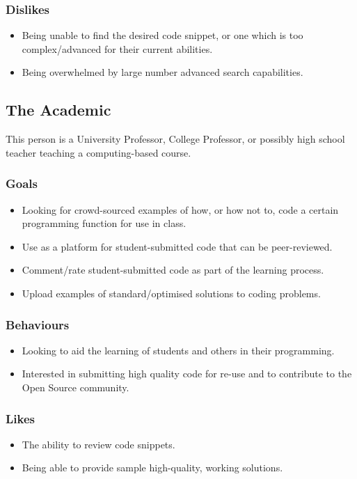 \documentclass[11pt,a4paper]{article}
\begin{document}
\subsubsection{Dislikes}

\begin{itemize}
\item Being unable to find the desired code snippet, or one which is
too complex/advanced for their current abilities.
\item Being overwhelmed by large number advanced search capabilities.
\end{itemize}

\subsection{The Academic}

This person is a University Professor, College Professor, or possibly high
school teacher teaching a computing-based course.

\subsubsection{Goals}

\begin{itemize}
\item Looking for crowd-sourced examples of how, or how not to, code a certain
programming function for use in class.
\item Use as a platform for student-submitted code that can be peer-reviewed.
\item Comment/rate student-submitted code as part of the learning process.
\item Upload examples of standard/optimised solutions to coding problems.
\end{itemize}

\subsubsection{Behaviours}
\begin{itemize}
\item Looking to aid the learning of students and others in their programming.
\item Interested in submitting high quality code for re-use and to contribute
to the Open Source community.
\end{itemize}

\subsubsection{Likes}
\begin{itemize}
\item The ability to review code snippets.
\item Being able to provide sample high-quality, working solutions.
\end{itemize}
\end{document}
